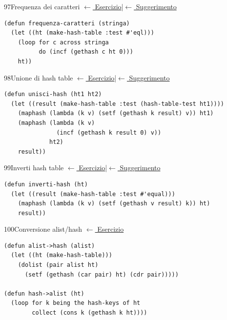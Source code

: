 \label{sol:97}
\begin{solbox}{97}{Frequenza dei caratteri}
\small\color{black!55}\hyperref[ex:97]{$\leftarrow$ Esercizio}\enspace\textcolor{black!30}{|}\enspace\hyperref[hint:97]{$\leftarrow$ Suggerimento}\normalsize\color{black}
\begin{lstlisting}
(defun frequenza-caratteri (stringa)
  (let ((ht (make-hash-table :test #'eql)))
    (loop for c across stringa
          do (incf (gethash c ht 0)))
    ht))
\end{lstlisting}
\end{solbox}

\label{sol:98}
\begin{solbox}{98}{Unione di hash table}
\small\color{black!55}\hyperref[ex:98]{$\leftarrow$ Esercizio}\enspace\textcolor{black!30}{|}\enspace\hyperref[hint:98]{$\leftarrow$ Suggerimento}\normalsize\color{black}
\begin{lstlisting}
(defun unisci-hash (ht1 ht2)
  (let ((result (make-hash-table :test (hash-table-test ht1))))
    (maphash (lambda (k v) (setf (gethash k result) v)) ht1)
    (maphash (lambda (k v)
               (incf (gethash k result 0) v))
             ht2)
    result))
\end{lstlisting}
\end{solbox}

\label{sol:99}
\begin{solbox}{99}{Inverti hash table}
\small\color{black!55}\hyperref[ex:99]{$\leftarrow$ Esercizio}\enspace\textcolor{black!30}{|}\enspace\hyperref[hint:99]{$\leftarrow$ Suggerimento}\normalsize\color{black}
\begin{lstlisting}
(defun inverti-hash (ht)
  (let ((result (make-hash-table :test #'equal)))
    (maphash (lambda (k v) (setf (gethash v result) k)) ht)
    result))
\end{lstlisting}
\end{solbox}

\label{sol:100}
\begin{solbox}{100}{Conversione alist/hash}
\small\color{black!55}\hyperref[ex:100]{$\leftarrow$ Esercizio}\normalsize\color{black}
\begin{lstlisting}
(defun alist->hash (alist)
  (let ((ht (make-hash-table)))
    (dolist (pair alist ht)
      (setf (gethash (car pair) ht) (cdr pair)))))

(defun hash->alist (ht)
  (loop for k being the hash-keys of ht
        collect (cons k (gethash k ht))))
\end{lstlisting}
\end{solbox}

